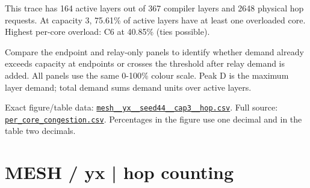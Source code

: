 \documentclass[10pt,a4paper]{article}
\begin{document}
This trace has 164 active layers out of 367 compiler layers and 2648 physical hop requests. At capacity 3, 75.61\% of active layers have at least one overloaded core. Highest per-core overload: C6 at 40.85\% (ties possible).\par
Compare the endpoint and relay-only panels to identify whether demand already exceeds capacity at endpoints or crosses the threshold after relay demand is added. All panels use the same 0-100\% colour scale. Peak D is the maximum layer demand; total demand sums demand units over active layers.\par
Exact figure/table data: \href{\detokenize{file:///home/dhruv-pansuriya/Documents/BTP/Compiler-Driven-ACE/output/pdf/qaoa_methods_congestion/tables/mesh__yx__seed44__cap3__hop.csv}}{\nolinkurl{mesh__yx__seed44__cap3__hop.csv}}. Full source: \href{\detokenize{file:///home/dhruv-pansuriya/Documents/BTP/Compiler-Driven-ACE/results/qaoa_2seed_2026-10-26/congestion/per_core_congestion.csv}}{\nolinkurl{per_core_congestion.csv}}. Percentages in the figure use one decimal and in the table two decimals.\par
\clearpage
\section*{MESH / yx | hop counting}
\end{document}
